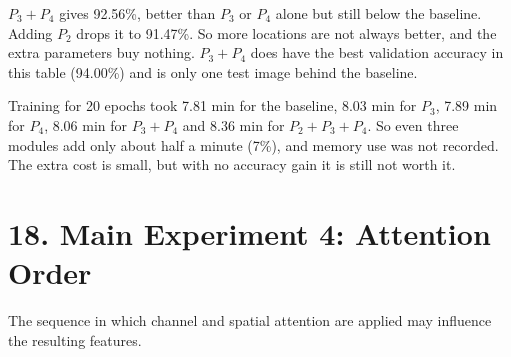 \documentclass[10pt]{article}
\begin{document}
\begin{table}[H]
\centering
\caption{Attention at one or several positions (Channel$\rightarrow$Spatial at every position).}
\label{tab:multi}
\end{table}

$P_3+P_4$ gives 92.56\%, better than $P_3$ or $P_4$ alone but still below the baseline. Adding $P_2$ drops it to 91.47\%. So more locations are not always better, and the extra parameters buy nothing. $P_3+P_4$ does have the best validation accuracy in this table (94.00\%) and is only one test image behind the baseline.

Training for 20 epochs took 7.81 min for the baseline, 8.03 min for $P_3$, 7.89 min for $P_4$, 8.06 min for $P_3+P_4$ and 8.36 min for $P_2+P_3+P_4$. So even three modules add only about half a minute (7\%), and memory use was not recorded. The extra cost is small, but with no accuracy gain it is still not worth it.

\section*{18. Main Experiment 4: Attention Order}

The sequence in which channel and spatial attention are applied may influence
the resulting features.
\end{document}
